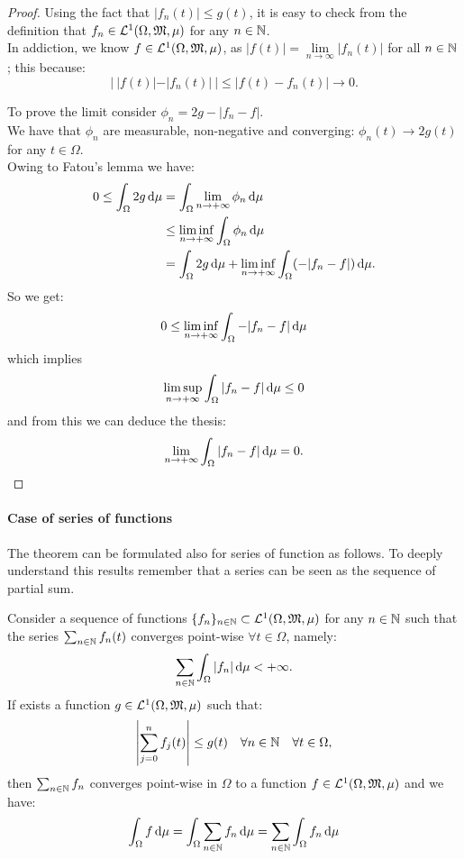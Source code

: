 \begin{proof}
	Using the fact that $|f_n(t)| \leq g(t)$, it is easy to check from the definition that $f_n \in \mathcal L^1(\Omega, \mathfrak M , \mu)$ for any $n \in \mathbb N$.\\
	In addiction, we know $f \in \mathcal L^1(\Omega, \mathfrak M , \mu)$, as $|f(t)| = \lim\limits_{n \to \infty}|f_n(t)|$ for all $n \in \mathbb N$; this because: $$|\ |f(t)| -|f_n(t)|\ | \leq |f(t) - f_n(t)| \to 0.$$
	
	To prove the limit consider $\phi_n = 2g-|f_n-f|$.\\
	We have that $\phi_n$ are measurable, non-negative and converging: $\phi_n(t) \to 2g(t)$ for any $t \in \Omega$.\\
	Owing to Fatou's lemma we have:
	\begin{align*}
		0 \leq \int_{\Omega} 2 g \,\mathrm d\mu
		&=\int_{\Omega} \lim_{n \to +\infty} \phi_n \,\mathrm d\mu\\
		&\leq \liminf_{n \to +\infty} \int_{\Omega} \phi_n \,\mathrm d\mu\\
		&=\int_\Omega 2 g \,\mathrm d\mu
		+ \liminf_{n \to +\infty} \int_\Omega(-|f_n-f|) \,\mathrm d\mu.
	\end{align*}
	So we get:
	$$ 0 \leq \liminf_{n \to +\infty} \int_\Omega -|f_n-f| \,\mathrm d\mu$$
	which implies
	$$ \limsup_{n \to +\infty} \int_\Omega |f_n-f| \,\mathrm d\mu \leq 0$$
	and from this we can deduce the thesis:
	$$ \lim_{n \to +\infty} \int_\Omega |f_n-f| \,\mathrm d\mu = 0. $$
\end{proof}


\paragraph{Case of series of functions} The theorem can be formulated also for series of function as follows. To deeply understand this results remember that a series can be seen as the sequence of partial sum.

\begin{theo}
	Consider a sequence of functions $\{f_n\}_{n \in \mathbb N} \subset \mathcal L^1(\Omega, \mathfrak M, \mu)$ for any $n \in \mathbb N$ such that the series $\sum_{n \in \mathbb N} f_n(t)$ converges point-wise $\forall t \in \Omega$, namely:
	$$\sum_{n\in \mathbb N} \int_\Omega|f_n| \,\mathrm d\mu < +\infty.$$
	If exists a function $g \in \mathcal L^1(\Omega, \mathfrak M, \mu)$ such that:
	$$ \left|\sum_{j = 0}^n f_j(t)\right| 
	\leq g(t)
	\quad \forall n \in \mathbb N
	\quad \forall t \in \Omega,$$
	then $\sum_{n\in\mathbb N} f_n$ converges point-wise in $\Omega$ to a function $f\in \mathcal L^1(\Omega, \mathfrak M, \mu)$ and we have:
	$$\int_\Omega f \,\mathrm d\mu 
	= \int_\Omega \sum_{n \in \mathbb N} f_n \, \mathrm d \mu 
	= \sum_{n\in \mathbb N} \int_\Omega f_n \,\mathrm d\mu$$
\end{theo}



